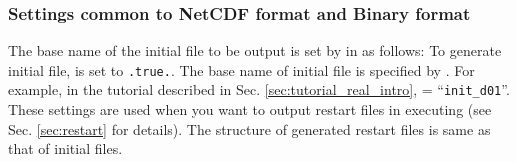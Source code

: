 \subsubsection{Settings common to NetCDF format and Binary format} \label{sec:datainput_common_setting}
The base name of the initial file to be output is set by  in  as follows:
To generate initial file,  is set to \verb|.true.|.
The base name of initial file is specified by .
For example, in the tutorial described in Sec. \ref{sec:tutorial_real_intro},  = ``\verb|init_d01|''.
These settings are used when you want to output restart files in executing \scalerm (see Sec. \ref{sec:restart} for details).
The structure of generated restart files is same as that of initial files.

